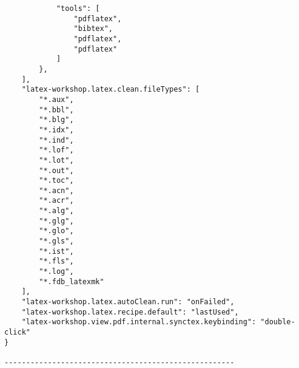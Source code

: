 \documentclass[a4paper,fontset=fandol,zihao=-4,linespread=1.2,oneside]{ctexbook}
\begin{document}
\begin{lstlisting}
            "tools": [
                "pdflatex",
                "bibtex",
                "pdflatex",
                "pdflatex"
            ]
        },
    ],
    "latex-workshop.latex.clean.fileTypes": [
        "*.aux",
        "*.bbl",
        "*.blg",
        "*.idx",
        "*.ind",
        "*.lof",
        "*.lot",
        "*.out",
        "*.toc",
        "*.acn",
        "*.acr",
        "*.alg",
        "*.glg",
        "*.glo",
        "*.gls",
        "*.ist",
        "*.fls",
        "*.log",
        "*.fdb_latexmk"
    ],
    "latex-workshop.latex.autoClean.run": "onFailed",
    "latex-workshop.latex.recipe.default": "lastUsed",
    "latex-workshop.view.pdf.internal.synctex.keybinding": "double-click"
}

-----------------------------------------------------

\end{lstlisting}
\end{document}
